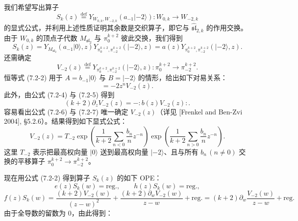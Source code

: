 我们希望写出算子
\[
    S_k(z)\overset{\mathrm{def}}{=}Y_{W_{0,k},W_{-2,k}}(a_{-1}|-2\rangle):W_{0,k}\longrightarrow W_{-2,k}
\]
的显式公式，并利用上述性质证明其余数是交织算子，即它与 $\widehat{\mathfrak{sl}}_{2,k}$ 的作用交换。由于 $W_{0,k}$ 的顶点子代数 $M_{\mathfrak{sl}_2}$ 与 $\pi_0^{k+2}$ 彼此交换，我们得到
\[
    S_k(z)=Y_{M_{\mathfrak{sl}_2}}(a_{-1}|0\rangle,z)Y_{\pi_0^{k+2},\pi_{-2}^{k+2}}(|-2\rangle,z)=a(z)Y_{\pi_0^{k+2},\pi_{-2}^{k+2}}(|-2\rangle,z).
\]
还需确定
\[
    V_{-2}(z)\overset{\mathrm{def}}{=}Y_{\pi_0^{k+2},\pi_{-2}^{k+2}}(|-2\rangle,z):\pi_0^{k+2}\longrightarrow\pi_{-2}^{k+2}.
\]
恒等式 (7.2-2) 用于 $A=b_{-1}|0\rangle$ 与 $B=|-2\rangle$ 的情形，给出如下对易关系：
\begin{equation}
    [b_n,V_{-2}(z)]=-2z^nV_{-2}(z).
    \tag{7.2-6}
\end{equation}
此外，由公式 (7.2-4) 与 (7.2-5) 得到
\begin{equation}
    (k+2)\partial_zV_{-2}(z)=-:b(z)V_{-2}(z):.
    \tag{7.2-7}
\end{equation}
容易看出公式 (7.2-6) 与 (7.2-7) 唯一确定 $V_{-2}(z)$（详见 [Frenkel and Ben-Zvi 2004], §5.2.6）。结果得到如下显式公式：
\begin{equation}
    V_{-2}(z)=T_{-2}\exp\left(\frac{1}{k+2}\sum_{n<0}\frac{b_n}{n}z^{-n}\right)
    \exp\left(\frac{1}{k+2}\sum_{n>0}\frac{b_n}{n}z^{-n}\right).
    \tag{7.2-8}
\end{equation}
这里 $T_{-2}$ 表示把最高权向量 $|0\rangle$ 送到最高权向量 $|-2\rangle$、且与所有 $b_n\,(n\ne0)$ 交换的平移算子 $\pi_0^{k+2}\to\pi_{-2}^{k+2}$。

现在用公式 (7.2-2) 得到算子 $S_k(z)$ 的如下 OPE：
\[
    e(z)S_k(w)=\mathrm{reg.},\qquad h(z)S_k(w)=\mathrm{reg.},
\]
\[
    f(z)S_k(w)=\frac{(k+2)V_{-2}(w)}{(z-w)^2}+\frac{(k+2)\partial_wV_{-2}(w)}{z-w}+\mathrm{reg.}
    =(k+2)\partial_w\frac{V_{-2}(w)}{z-w}+\mathrm{reg.}
\]
由于全导数的留数为 $0$，由此得到：

